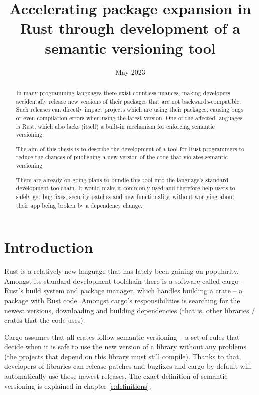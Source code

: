 \documentclass[licencjacka,en]{pracamgr}
\title{Accelerating package expansion in Rust through development of a semantic versioning tool}
\date{May 2023}
\begin{document}
\maketitle

\begin{abstract}
In many programming languages there exist countless nuances,
making developers accidentally release new versions of their packages
that are not backwards-compatible.
Such releases can directly impact projects which are using their packages,
causing bugs or even compilation errors when using the latest version.
One of the affected languages is Rust,
which also lacks (itself) a built-in mechanism for enforcing semantic versioning.

The aim of this thesis is to describe the development of a tool
for Rust programmers to reduce the chances of publishing
a new version of the code that violates semantic versioning.

There are already on-going plans to bundle this tool
into the language's standard development toolchain.
It would make it commonly used and therefore help users to safely get bug fixes,
security patches and new functionality,
without worrying about their app being broken by a dependency change.
\end{abstract}

\tableofcontents



\chapter*{Introduction}

Rust is a relatively new language that has lately been gaining on popularity.
Amongst its standard development toolchain there is a software called cargo 
-- Rust's build system and package manager,
which handles building a crate -- a package with Rust code.
Amongst cargo's responsibilities is searching for the newest versions,
downloading and building dependencies
(that is, other libraries / crates that the code uses).

Cargo assumes that all crates follow semantic versioning
-- a set of rules that decide when it is safe to use the new version of a library
without any problems (the projects that depend on this library must still compile).
Thanks to that, developers of libraries can release patches and bugfixes
and cargo by default will automatically use those newest releases.
The exact definition of semantic versioning is explained in chapter \ref{r:definitions}.
\end{document}
